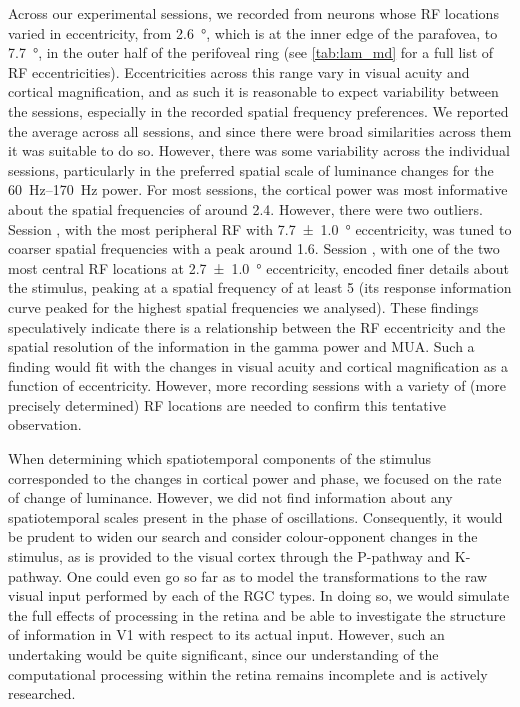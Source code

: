 Across our experimental sessions, we recorded from neurons whose \ac{RF} locations varied in eccentricity, from \SI{2.6}{\degree}, which is at the inner edge of the parafovea, to \SI{7.7}{\degree}, in the outer half of the perifoveal ring (see \autoref{tab:lam_md} for a full list of \ac{RF} eccentricities).
Eccentricities across this range vary in visual acuity and cortical magnification, and as such it is reasonable to expect variability between the sessions, especially in the recorded spatial frequency preferences.
We reported the average across all sessions, and since there were broad similarities across them it was suitable to do so.
However, there was some variability across the individual sessions, particularly in the preferred spatial scale of luminance changes for the \SIrange{60}{170}{Hz} power.
For most sessions, the cortical power was most informative about the spatial frequencies of around \SI{2.4}{\cpd}.
However, there were two outliers.
Session , with the most peripheral \ac{RF} with \SI{7.7\pm1.0}{\degree} eccentricity, was tuned to coarser spatial frequencies with a peak around \SI{1.6}{\cpd}.
Session , with one of the two most central \ac{RF} locations at \SI{2.7\pm1.0}{\degree} eccentricity, encoded finer details about the stimulus, peaking at a spatial frequency of at least \SI{5}{\cpd} (its response information curve peaked for the highest spatial frequencies we analysed).
These findings speculatively indicate there is a relationship between the \ac{RF} eccentricity and the spatial resolution of the information in the gamma power and \ac{MUA}.
Such a finding would fit with the changes in visual acuity and cortical magnification as a function of eccentricity.
However, more recording sessions with a variety of (more precisely determined) \ac{RF} locations are needed to confirm this tentative observation.

When determining which spatiotemporal components of the stimulus corresponded to the changes in cortical power and phase, we focused on the rate of change of luminance.
However, we did not find information about any spatiotemporal scales present in the phase of oscillations.
Consequently, it would be prudent to widen our search and consider colour-opponent changes in the stimulus, as is provided to the visual cortex through the P-pathway and K-pathway.
One could even go so far as to model the transformations to the raw visual input performed by each of the \ac{RGC} types.
In doing so, we would simulate the full effects of processing in the retina and be able to investigate the structure of information in \ac{V1} with respect to its actual input.
However, such an undertaking would be quite significant, since our understanding of the computational processing within the retina remains incomplete and is actively researched.

